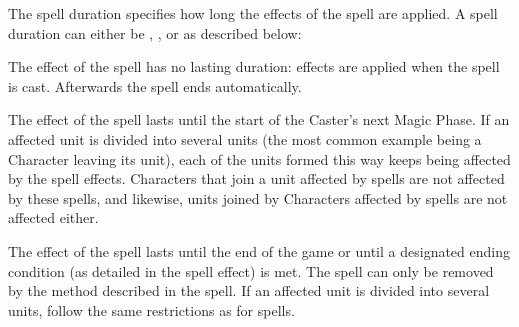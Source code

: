 
The spell duration specifies how long the effects of the spell are applied. A spell duration can either be \instant{}, \oneturn{}, or \permanent{} as described below:

\basicsubsubtitle{\instant}

The effect of the spell has no lasting duration: effects are applied when the spell is cast. Afterwards the spell ends automatically.

\basicsubsubtitle{\oneturn}

The effect of the spell lasts until the start of the Caster's next Magic Phase. If an affected unit is divided into several units (the most common example being a Character leaving its unit), each of the units formed this way keeps being affected by the spell effects. Characters that join a unit affected by \oneturn{} spells are not affected by these spells, and likewise, units joined by Characters affected by \oneturn{} spells are not affected either.

\basicsubsubtitle{\permanent}

The effect of the spell lasts until the end of the game or until a designated ending condition (as detailed in the spell effect) is met. The spell can only be removed by the method described in the spell. If an affected unit is divided into several units, follow the same restrictions as for \oneturn{} spells.














\tablelabels
\spelllabelandtitle{\attributespellnumber}{\alchemyattribute}

\tablespellcastingvalue{}
\tablespelltype{\hex}
\tablespellduration{\oneturn}
\spellrule
{}

\tablespelltype{\damage\newline\hex\newline\missile}
\tablespellduration{\instant}
\spellrule
{}

